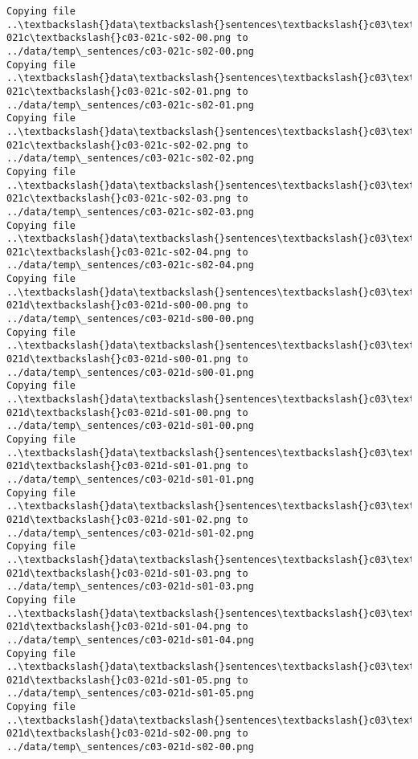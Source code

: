 \documentclass[11pt]{article}
\begin{document}
\begin{Verbatim}[commandchars=\\\{\}]
Copying file ..\textbackslash{}data\textbackslash{}sentences\textbackslash{}c03\textbackslash{}c03-021c\textbackslash{}c03-021c-s02-00.png to
../data/temp\_sentences/c03-021c-s02-00.png
Copying file ..\textbackslash{}data\textbackslash{}sentences\textbackslash{}c03\textbackslash{}c03-021c\textbackslash{}c03-021c-s02-01.png to
../data/temp\_sentences/c03-021c-s02-01.png
Copying file ..\textbackslash{}data\textbackslash{}sentences\textbackslash{}c03\textbackslash{}c03-021c\textbackslash{}c03-021c-s02-02.png to
../data/temp\_sentences/c03-021c-s02-02.png
Copying file ..\textbackslash{}data\textbackslash{}sentences\textbackslash{}c03\textbackslash{}c03-021c\textbackslash{}c03-021c-s02-03.png to
../data/temp\_sentences/c03-021c-s02-03.png
Copying file ..\textbackslash{}data\textbackslash{}sentences\textbackslash{}c03\textbackslash{}c03-021c\textbackslash{}c03-021c-s02-04.png to
../data/temp\_sentences/c03-021c-s02-04.png
Copying file ..\textbackslash{}data\textbackslash{}sentences\textbackslash{}c03\textbackslash{}c03-021d\textbackslash{}c03-021d-s00-00.png to
../data/temp\_sentences/c03-021d-s00-00.png
Copying file ..\textbackslash{}data\textbackslash{}sentences\textbackslash{}c03\textbackslash{}c03-021d\textbackslash{}c03-021d-s00-01.png to
../data/temp\_sentences/c03-021d-s00-01.png
Copying file ..\textbackslash{}data\textbackslash{}sentences\textbackslash{}c03\textbackslash{}c03-021d\textbackslash{}c03-021d-s01-00.png to
../data/temp\_sentences/c03-021d-s01-00.png
Copying file ..\textbackslash{}data\textbackslash{}sentences\textbackslash{}c03\textbackslash{}c03-021d\textbackslash{}c03-021d-s01-01.png to
../data/temp\_sentences/c03-021d-s01-01.png
Copying file ..\textbackslash{}data\textbackslash{}sentences\textbackslash{}c03\textbackslash{}c03-021d\textbackslash{}c03-021d-s01-02.png to
../data/temp\_sentences/c03-021d-s01-02.png
Copying file ..\textbackslash{}data\textbackslash{}sentences\textbackslash{}c03\textbackslash{}c03-021d\textbackslash{}c03-021d-s01-03.png to
../data/temp\_sentences/c03-021d-s01-03.png
Copying file ..\textbackslash{}data\textbackslash{}sentences\textbackslash{}c03\textbackslash{}c03-021d\textbackslash{}c03-021d-s01-04.png to
../data/temp\_sentences/c03-021d-s01-04.png
Copying file ..\textbackslash{}data\textbackslash{}sentences\textbackslash{}c03\textbackslash{}c03-021d\textbackslash{}c03-021d-s01-05.png to
../data/temp\_sentences/c03-021d-s01-05.png
Copying file ..\textbackslash{}data\textbackslash{}sentences\textbackslash{}c03\textbackslash{}c03-021d\textbackslash{}c03-021d-s02-00.png to
../data/temp\_sentences/c03-021d-s02-00.png

\end{Verbatim}
\end{document}
